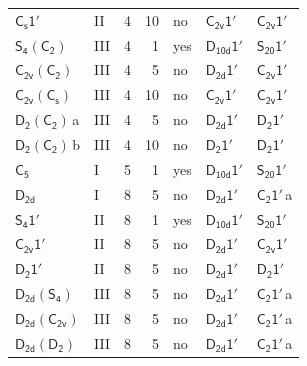 \documentclass[10pt,a4paper]{article}
\numberwithin{equation}{section}
\newcommand{\grp}[1]{\mathsf{#1}}
\newcommand{\clsletter}[1]{\,{\scriptsize\color{black!55}#1}}
\begin{document}
{\begin{longtable}{@{}llrrlll@{}}
\href{C1v-1p.pdf}{$\grp{C_{s}1'}$} & II & 4 & 10 & no & \href{C2v-1p.pdf}{$\grp{C_{2v}1'}$} & \href{C2v-1p.pdf}{$\grp{C_{2v}1'}$}\\
\href{S4-C2.pdf}{$\grp{S_{4}}(\grp{C_{2}})$} & III & 4 & 1 & yes & \href{D10d-1p.pdf}{$\grp{D_{10d}1'}$} & \href{S20-1p.pdf}{$\grp{S_{20}1'}$}\\
\href{C2v-C2.pdf}{$\grp{C_{2v}}(\grp{C_{2}})$} & III & 4 & 5 & no & \href{D2d-1p.pdf}{$\grp{D_{2d}1'}$} & \href{C2v-1p.pdf}{$\grp{C_{2v}1'}$}\\
\href{C2v-C1v.pdf}{$\grp{C_{2v}}(\grp{C_{s}})$} & III & 4 & 10 & no & \href{C2v-1p.pdf}{$\grp{C_{2v}1'}$} & \href{C2v-1p.pdf}{$\grp{C_{2v}1'}$}\\
\href{D2-C2.pdf}{$\grp{D_{2}}(\grp{C_{2}})$}\clsletter{a} & III & 4 & 5 & no & \href{D2d-1p.pdf}{$\grp{D_{2d}1'}$} & \href{D2-1p.pdf}{$\grp{D_{2}1'}$}\\
\href{D2-C2.pdf}{$\grp{D_{2}}(\grp{C_{2}})$}\clsletter{b} & III & 4 & 10 & no & \href{D2-1p.pdf}{$\grp{D_{2}1'}$} & \href{D2-1p.pdf}{$\grp{D_{2}1'}$}\\
\href{../../../rotation/data/pdf/C5.pdf}{$\grp{C_{5}}$} & I & 5 & 1 & yes & \href{D10d-1p.pdf}{$\grp{D_{10d}1'}$} & \href{S20-1p.pdf}{$\grp{S_{20}1'}$}\\
\href{../../../rotation/data/pdf/D2d.pdf}{$\grp{D_{2d}}$} & I & 8 & 5 & no & \href{D2d-1p.pdf}{$\grp{D_{2d}1'}$} & \href{C2-1p.pdf}{$\grp{C_{2}1'}$}\clsletter{a}\\
\href{S4-1p.pdf}{$\grp{S_{4}1'}$} & II & 8 & 1 & yes & \href{D10d-1p.pdf}{$\grp{D_{10d}1'}$} & \href{S20-1p.pdf}{$\grp{S_{20}1'}$}\\
\href{C2v-1p.pdf}{$\grp{C_{2v}1'}$} & II & 8 & 5 & no & \href{D2d-1p.pdf}{$\grp{D_{2d}1'}$} & \href{C2v-1p.pdf}{$\grp{C_{2v}1'}$}\\
\href{D2-1p.pdf}{$\grp{D_{2}1'}$} & II & 8 & 5 & no & \href{D2d-1p.pdf}{$\grp{D_{2d}1'}$} & \href{D2-1p.pdf}{$\grp{D_{2}1'}$}\\
\href{D2d-S4.pdf}{$\grp{D_{2d}}(\grp{S_{4}})$} & III & 8 & 5 & no & \href{D2d-1p.pdf}{$\grp{D_{2d}1'}$} & \href{C2-1p.pdf}{$\grp{C_{2}1'}$}\clsletter{a}\\
\href{D2d-C2v.pdf}{$\grp{D_{2d}}(\grp{C_{2v}})$} & III & 8 & 5 & no & \href{D2d-1p.pdf}{$\grp{D_{2d}1'}$} & \href{C2-1p.pdf}{$\grp{C_{2}1'}$}\clsletter{a}\\
\href{D2d-D2.pdf}{$\grp{D_{2d}}(\grp{D_{2}})$} & III & 8 & 5 & no & \href{D2d-1p.pdf}{$\grp{D_{2d}1'}$} & \href{C2-1p.pdf}{$\grp{C_{2}1'}$}\clsletter{a}\\

\end{longtable}}
\end{document}
